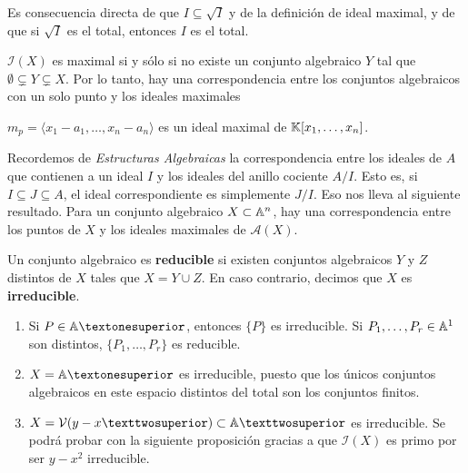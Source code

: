 \documentclass[ACGA.tex]{subfiles}
\begin{document}
\begin{dem}
Es consecuencia directa de que $I \subseteq \sqrt{I}$ y de la definición de ideal maximal, y de que si $\sqrt{I}$ es el total, entonces $I$ es el total.
\end{dem}

\begin{teorema}
$\mathcal{I}(X)$ es maximal si y sólo si no existe un conjunto algebraico $Y$ tal que $\emptyset \subsetneq Y \subsetneq X$. Por lo tanto, hay una correspondencia entre los conjuntos algebraicos con un solo punto y los ideales maximales
\end{teorema}

\begin{ejer}
$m_p = \langle x_1-a_1, \dots,x_n-a_n \rangle$ es un ideal maximal de $\mathbb{K}[x_1,\dots,x_n]$.
\end{ejer}

\begin{nota}
Recordemos de \emph{Estructuras Algebraicas} la correspondencia entre los ideales de $A$ que contienen a un ideal $I$ y los ideales del anillo cociente $A/I$. Esto es, si $I\subseteq J\subseteq A$, el ideal correspondiente es simplemente $J/I$. Eso nos lleva al siguiente resultado. Para un conjunto algebraico $X \subset \mathbb{A}^n$, hay una correspondencia entre los puntos de $X$ y los ideales maximales de $\mathcal{A}(X)$.
\end{nota}

\begin{defi}
Un conjunto algebraico es \textbf{reducible} si existen conjuntos algebraicos $Y$ y $Z$ distintos de $X$ tales que $X = Y \cup Z$. En caso contrario, decimos que $X$ es \textbf{irreducible}.
\end{defi}

\begin{ej}\mbox{}
\begin{enumerate}
	\item Si $P \in \A¹$, entonces $\{P\}$ es irreducible. Si $P_1,\dots,P_r \in \mathbb{A}^1$ son distintos, $\{P_1,\dots,P_r\}$ es reducible.
	\item $X=\A¹$ es irreducible, puesto que los únicos conjuntos algebraicos en este espacio distintos del total son los conjuntos finitos.
	\item $X=\mathcal{V}(y-x²) \subset \A²$ es irreducible. Se podrá probar con la siguiente proposición gracias a que $\mathcal{I}(X)$ es primo por ser $y-x^2$ irreducible.
\end{enumerate}
\end{ej}
\end{document}
